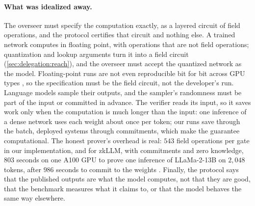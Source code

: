 \begin{refsection}
\paragraph{What was idealized away.} The overseer must specify the computation exactly, as a layered circuit of field operations, and the protocol certifies that circuit and nothing else. A trained network computes in floating point, with operations that are not field operations; quantization and lookup arguments turn it into a field circuit (\cref{sec:delegation:reach}), and the overseer must accept the quantized network as the model. Floating-point runs are not even reproducible bit for bit across GPU types \parencite{SrivastavaAroraBoneh2024}, so the specification must be the field circuit, not the developer's run. Language models sample their outputs, and the sampler's randomness must be part of the input or committed in advance. The verifier reads its input, so it saves work only when the computation is much longer than the input: one inference of a dense network uses each weight about once per token; our runs save through the batch, deployed systems through commitments, which make the guarantee computational. The honest prover's overhead is real: $543$ field operations per gate in our implementation, and for zkLLM, with commitments and zero knowledge, $803$ seconds on one A100 GPU to prove one inference of LLaMa-2-13B on $2{,}048$ tokens, after $986$ seconds to commit to the weights \parencite[Table~1]{SunLiZhang2024}. Finally, the protocol says that the published outputs are what the model computes, not that they are good, that the benchmark measures what it claims to, or that the model behaves the same way elsewhere.


\end{refsection}
